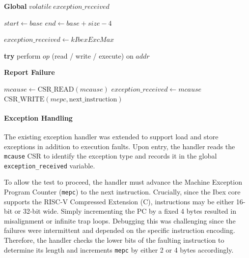 \documentclass[10pt,a4paper,twocolumn,twoside]{article}
\begin{document}
\begin{algorithm}[H]
\caption{Memory Protection Verification Routine}
\label{alg:probe_logic}
\begin{algorithmic}[1]
\State \textbf{Global} $volatile\ exception\_received$

    \State $start \gets base$
    \State $end \gets base + size - 4$
        \State {}
    \EndFor
\EndProcedure

    \State $exception\_received \gets kIbexExcMax$
    
    \State \textbf{try} perform $op$ (read / write / execute) on $addr$
    
        \State {}
    \EndIf
    
        \State \textbf{Report Failure}
    \EndIf
\EndProcedure

    \State $mcause \gets \text{CSR\_READ}(mcause)$
    \State $exception\_received \gets mcause$
    \State $\text{CSR\_WRITE}(mepc, \text{next\_instruction})$
\EndProcedure
\end{algorithmic}
\end{algorithm}

\paragraph{Exception Handling}
The existing exception handler was extended to support load and store exceptions in addition to execution faults. Upon entry, the handler reads the \texttt{mcause} CSR to identify the exception type and records it in the global \texttt{exception\_received} variable. 

To allow the test to proceed, the handler must advance the Machine Exception Program Counter (\texttt{mepc}) to the next instruction. Crucially, since the Ibex core supports the RISC-V Compressed Extension (C), instructions may be either 16-bit or 32-bit wide. Simply incrementing the PC by a fixed 4 bytes resulted in misalignment or infinite trap loops. Debugging this was challenging since the failures were intermittent and depended on the specific instruction encoding. Therefore, the handler checks the lower bits of the faulting instruction to determine its length and increments \texttt{mepc} by either 2 or 4 bytes accordingly.
\end{document}
